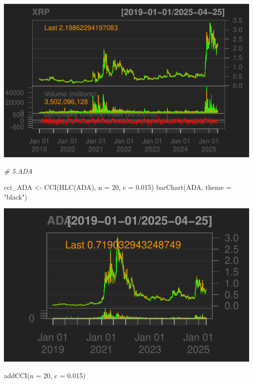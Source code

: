 \documentclass[]{tufte-handout}
\newenvironment{Shaded}{}{}
\newcommand{\AttributeTok}[1]{\textcolor[rgb]{0.49,0.56,0.16}{#1}}
\newcommand{\CommentTok}[1]{\textcolor[rgb]{0.38,0.63,0.69}{\textit{#1}}}
\newcommand{\DecValTok}[1]{\textcolor[rgb]{0.25,0.63,0.44}{#1}}
\newcommand{\FloatTok}[1]{\textcolor[rgb]{0.25,0.63,0.44}{#1}}
\newcommand{\FunctionTok}[1]{\textcolor[rgb]{0.02,0.16,0.49}{#1}}
\newcommand{\NormalTok}[1]{#1}
\newcommand{\OtherTok}[1]{\textcolor[rgb]{0.00,0.44,0.13}{#1}}
\newcommand{\StringTok}[1]{\textcolor[rgb]{0.25,0.44,0.63}{#1}}
\begin{document}
\includegraphics{cripto_update_files/figure-latex/unnamed-chunk-11-8}

\begin{Shaded}
\begin{Highlighting}[]
\CommentTok{\# 5.ADA}

\NormalTok{cci\_ADA }\OtherTok{\textless{}{-}} \FunctionTok{CCI}\NormalTok{(}\FunctionTok{HLC}\NormalTok{(ADA), }\AttributeTok{n =} \DecValTok{20}\NormalTok{, }\AttributeTok{c =} \FloatTok{0.015}\NormalTok{)}
\FunctionTok{barChart}\NormalTok{(ADA, }\AttributeTok{theme =} \StringTok{"black"}\NormalTok{)}
\end{Highlighting}
\end{Shaded}

\includegraphics{cripto_update_files/figure-latex/unnamed-chunk-11-9}

\begin{Shaded}
\begin{Highlighting}[]
\FunctionTok{addCCI}\NormalTok{(}\AttributeTok{n =} \DecValTok{20}\NormalTok{, }\AttributeTok{c =} \FloatTok{0.015}\NormalTok{)}
\end{Highlighting}
\end{Shaded}
\end{document}
